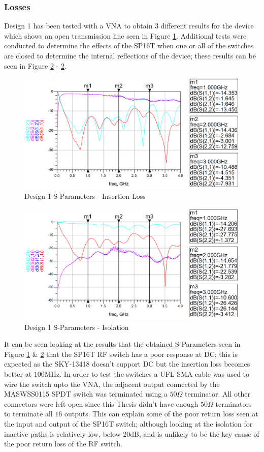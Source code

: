\documentclass[12pt,openany,a4paper]{book}
\begin{document}
\subsubsection{Losses}
Design 1 has been tested with a VNA to obtain $3$ different results for the device which shows an open transmission line seen in Figure \ref{fig:design1_1}. Additional tests were conducted to determine the effects of the SP16T when one or all of the switches are closed to determine the internal reflections of the device; these results can be seen in Figure \ref{fig:design1_2} - \ref{fig:design1_2}.
\begin{figure}[H]
	\centering
	\includegraphics[width=1\textwidth]{Design1-open.png}
	\caption{Design 1 S-Parameters - Insertion Loss}
	\label{fig:design1_1}
\end{figure} 
\begin{figure}[H]
	\centering
	\includegraphics[width=1\textwidth]{Design1.png}
	\caption{Design 1 S-Parameters - Isolation}
	\label{fig:design1_2}
\end{figure} 
It can be seen looking at the results that the obtained S-Parameters seen in Figure \ref{fig:design1_1} \& \ref{fig:design1_2} that the SP16T RF switch has a poor response at DC; this is expected as the SKY-13418 doesn't support DC but the insertion loss becomes better at $100$MHz. In order to test the switches a UFL-SMA cable was used to wire the switch upto the VNA, the adjacent output connected by the MASWSS0115 SPDT switch was terminated using a $50\Omega$ terminator. All other connectors were left open since this Thesis didn't have enough $50\Omega$ terminators to terminate all $16$ outputs. This can explain some of the poor return loss seen at the input and output of the SP16T switch; although looking at the isolation for inactive paths is relatively low, below $20$dB, and is unlikely to be the key cause of the poor return loss of the RF switch.\\ 
\end{document}
